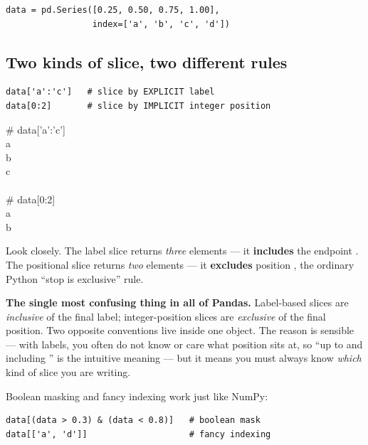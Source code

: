 \documentclass[11pt]{article}
\begin{document}
\begin{lstlisting}
data = pd.Series([0.25, 0.50, 0.75, 1.00],
                 index=['a', 'b', 'c', 'd'])
\end{lstlisting}

\subsection{Two kinds of slice, two different rules}

\begin{lstlisting}
data['a':'c']   # slice by EXPLICIT label
data[0:2]       # slice by IMPLICIT integer position
\end{lstlisting}

\begin{outbox}
\# data['a':'c'] \\
a  \\
b  \\
c  \\
\\
\# data[0:2] \\
a  \\
b 
\end{outbox}

Look closely. The label slice  returns \emph{three} elements --- it \textbf{includes} the endpoint . The positional slice  returns \emph{two} elements --- it \textbf{excludes} position , the ordinary Python ``stop is exclusive'' rule.

\begin{pitfall}
\textbf{The single most confusing thing in all of Pandas.} Label-based slices are \emph{inclusive} of the final label; integer-position slices are \emph{exclusive} of the final position. Two opposite conventions live inside one object. The reason is sensible --- with labels, you often do not know or care what position  sits at, so ``up to and including '' is the intuitive meaning --- but it means you must always know \emph{which} kind of slice you are writing.
\end{pitfall}

Boolean masking and fancy indexing work just like NumPy:

\begin{lstlisting}
data[(data > 0.3) & (data < 0.8)]   # boolean mask
data[['a', 'd']]                    # fancy indexing
\end{lstlisting}
\end{document}
